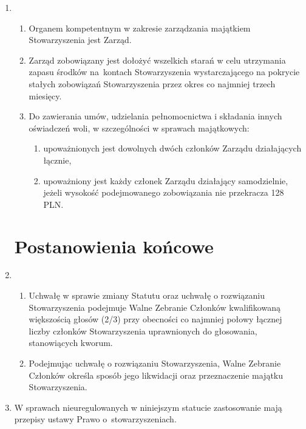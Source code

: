 \documentclass[chapterprefix,notitlepage]{article}
\begin{document}
\begin{enumerate}
	\item \begin{enumerate}
		\item Organem kompetentnym w zakresie zarządzania majątkiem Stowarzyszenia jest Zarząd.
		\item Zarząd zobowiązany jest dołożyć wszelkich starań w celu utrzymania zapasu środków na~kontach Stowarzyszenia wystarczającego na pokrycie stałych zobowiązań Stowarzyszenia przez okres co najmniej trzech miesięcy.
		\item Do zawierania umów, udzielania pełnomocnictwa i składania innych oświadczeń woli, w szczególności w sprawach majątkowych:
		\begin{enumerate}
			\item upoważnionych jest dowolnych dwóch członków Zarządu działających łącznie,
			\item upoważniony jest każdy członek Zarządu działający samodzielnie, jeżeli wysokość podejmowanego zobowiązania nie przekracza 128 PLN.
		\end{enumerate}
	\end{enumerate}
	

\section{Postanowienia końcowe}
	
	\item \begin{enumerate}
		\item Uchwałę w sprawie zmiany Statutu oraz uchwałę o rozwiązaniu Stowarzyszenia podejmuje Walne Zebranie Członków kwalifikowaną większością głosów (2/3) przy obecności co najmniej połowy łącznej liczby członków Stowarzyszenia uprawnionych do głosowania, stanowiących kworum.
		\item Podejmując uchwałę o rozwiązaniu Stowarzyszenia, Walne Zebranie Członków określa sposób jego likwidacji oraz przeznaczenie majątku Stowarzyszenia.
	\end{enumerate}		
	
	\item  W sprawach nieuregulowanych w niniejszym statucie zastosowanie mają przepisy ustawy Prawo o~stowarzyszeniach.
			
\end{enumerate}
\end{document}
